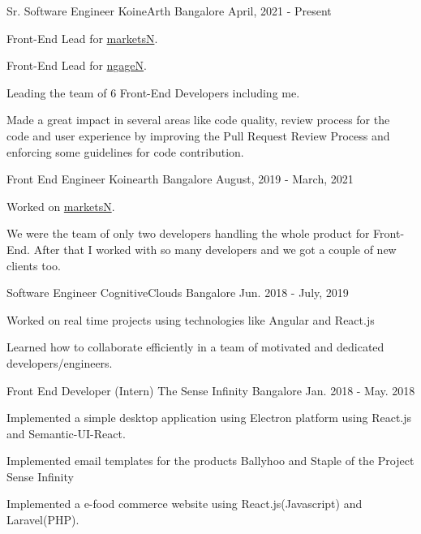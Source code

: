\begin{cventries}
  \cventry
    {Sr. Software Engineer}
    {KoineArth}
    {Bangalore}
    {April, 2021 - Present}
    {
      \begin{cvitems}
        \item{Front-End Lead for \href{https://marketsn.com/}{marketsN}.}
        \item{Front-End Lead for \href{https://ngagen.com/}{ngageN}.}
        \item{Leading the team of 6 Front-End Developers including me.}
        \item{Made a great impact in several areas like code quality, review process for the code and user experience by improving the Pull Request Review Process and enforcing some guidelines for code contribution.}
      \end{cvitems}
    }
  \cventry
    {Front End Engineer}
    {Koinearth}
    {Bangalore}
    {August, 2019 - March, 2021}
    {
        \begin{cvitems}
            \item{Worked on \href{https://marketsn.com/}{marketsN}.}
            \item{We were the team of only two developers handling the whole product for Front-End. After that I worked with so many developers and we got a couple of new clients too.}
        \end{cvitems}
  }
  \cventry
    {Software Engineer}
    {CognitiveClouds}
    {Bangalore}
    {Jun. 2018 - July, 2019}
    {
      \begin{cvitems}
        \item{Worked on real time projects using technologies like Angular and React.js}
        \item{Learned how to collaborate efficiently in a team of motivated and dedicated developers/engineers.}
      \end{cvitems}
    }
  \cventry
    {Front End Developer (Intern)}
    {The Sense Infinity}
    {Bangalore}
    {Jan. 2018 - May. 2018}
    {
      \begin{cvitems}
        \item{ Implemented a simple desktop application using Electron platform using React.js and Semantic-UI-React.}
        \item {Implemented email templates for the products Ballyhoo and Staple of the Project Sense Infinity}
        \item {Implemented a e-food commerce website using React.js(Javascript) and Laravel(PHP).}

\end{cvitems}}
\end{cventries}
